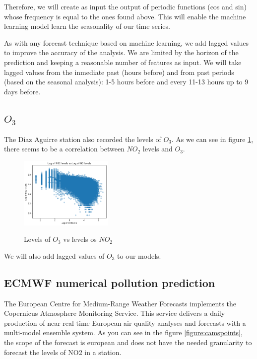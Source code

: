 \documentclass[a4paper,twocolumn,5p]{elsarticle}
\begin{document}
Therefore, we will create as input the output of periodic functions (cos and sin) whose frequency 
is equal to the ones found 
above. This will enable the machine learning model learn the seasonality of our time series.

As with any forecast technique based on machine learning, we add lagged values to improve the accuracy 
of the analysis. We are limited by the horizon of the prediction and 
keeping a reasonable number of features as input. We will take lagged values from the inmediate past (hours before)
and from past periods (based on the seasonal analysis): 1-5 hours before and every 11-13 hours up to 9 days before.

\subsection{$O_3$}

The Diaz Aguirre station also recorded the levels of $O_3$. As we can see in figure \ref{figure:no2vso3},
there seems to be a correlation between $NO_2$ levels and $O_3$.

\begin{figure}
  \centering
  \includegraphics[width=0.4\textwidth]{no2vso3}
  \label{figure:no2vso3}
  \caption{Levels of $O_3$ vs levels os $NO_2$}
\end{figure}

We will also add lagged values of $O_3$ to our models.

\subsection{ECMWF numerical pollution prediction}
\label{sec:ecmwf-numer-poll}

The European Centre for Medium-Range Weather Forecasts implements the Copernicus Atmosphere Monitoring Service.
This service delivers a daily production of near-real-time European air quality analyses and forecasts 
with a multi-model ensemble system. 
As you can see in the figure \ref{figure:camspoints}, the scope of the forecast is european and does not have the needed granularity to forecast 
the levels of NO2 in a station.
\end{document}
